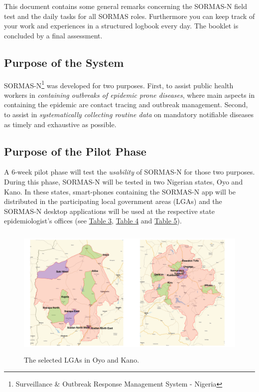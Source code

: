\documentclass[a4paper, titlepage]{tufte-handout}
\begin{document}
This document contains some general remarks concerning the SORMAS-N field test and the daily tasks for all SORMAS roles.
Furthermore you can keep track of your work and experiences in a structured logbook every day. The booklet is concluded by a final assessment.
\subsection{Purpose of the System}
\label{sec-1-1}

SORMAS-N\footnote{Surveillance \& Outbreak Response Management System - Nigeria} was developed for two purposes. First, to assist public health workers in \emph{containing outbreaks of epidemic prone diseases}, where main aspects in containing the epidemic are contact tracing and outbreak management.
Second, to assist in \emph{systematically collecting routine data} on mandatory notifiable diseases as timely and exhaustive as possible.

\subsection{Purpose of the Pilot Phase}
\label{sec-1-2}

A 6-week pilot phase will test the \emph{usability} of SORMAS-N for those two purposes. During this phase, SORMAS-N will be tested in two Nigerian states, Oyo and Kano. In these states, smart-phones containing the SORMAS-N app will be distributed in the participating local government areas (LGAs) and the SORMAS-N desktop applications will be used at the respective state epidemiologist’s offices (see \hyperref[tab:roles]{Table 3}, \hyperref[tab:user-kano]{Table 4} and \hyperref[tab:user-oyo]{Table 5}). 

\begin{figure}[htb]
\centering
\includegraphics[height=180pt]{../../img/geo_lgas.pdf}
\caption{\label{fig:geo-lgas}The selected LGAs in Oyo and Kano.}
\end{figure}
\end{document}
